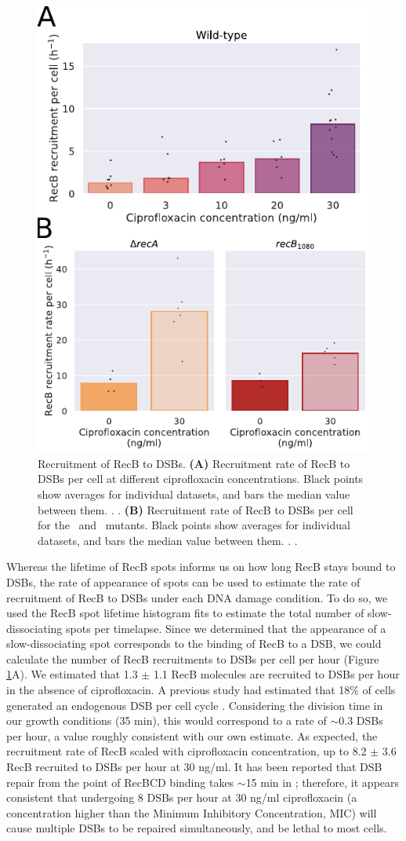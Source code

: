 \begin{figure}[htbp]
    \centering
    \includegraphics[width=.4\textwidth]{Figures/Fig3_RecB_recruitment.pdf}
    \caption{Recruitment of RecB to DSBs. \textbf{(A)} Recruitment rate of RecB to DSBs per cell at different ciprofloxacin concentrations. Black points show averages for individual datasets, and bars the median value between them. . . \textbf{(B)} Recruitment rate of RecB to DSBs per cell for the \dreca\ and \geneteneighty\ mutants. Black points show averages for individual datasets, and bars the median value between them. . .}
    \label{Fig:recruitment}
\end{figure}

Whereas the lifetime of RecB spots informs us on how long RecB stays bound to DSBs, the rate of appearance of spots can be used to estimate the rate of recruitment of RecB to DSBs under each DNA damage condition. To do so, we used the RecB spot lifetime histogram fits to estimate the total number of slow-dissociating spots per timelapse. Since we determined that the appearance of a slow-dissociating spot corresponds to the binding of RecB to a DSB, we could calculate the number of RecB recruitments to DSBs per cell per hour (Figure \ref{Fig:recruitment}A). We estimated that 1.3 $\pm$ 1.1 RecB molecules are recruited to DSBs per hour in the absence of ciprofloxacin. A previous study had estimated that 18\% of cells generated an endogenous DSB per cell cycle \cite{Sinha2018}. Considering the division time in our growth conditions (35 min), this would correspond to a rate of $\sim$0.3 DSBs per hour, a value roughly consistent with our own estimate. As expected, the recruitment rate of RecB scaled with ciprofloxacin concentration, up to 8.2 $\pm$ 3.6 RecB recruited to DSBs per hour at 30 ng/ml. It has been reported that DSB repair from the point of RecBCD binding takes $\sim$15 min in \ecoli \cite{Wiktor2021}; therefore, it appears consistent that undergoing 8 DSBs per hour at 30 ng/ml ciprofloxacin (a concentration higher than the Minimum Inhibitory Concentration, MIC) will cause multiple DSBs to be repaired simultaneously, and be lethal to most cells.

